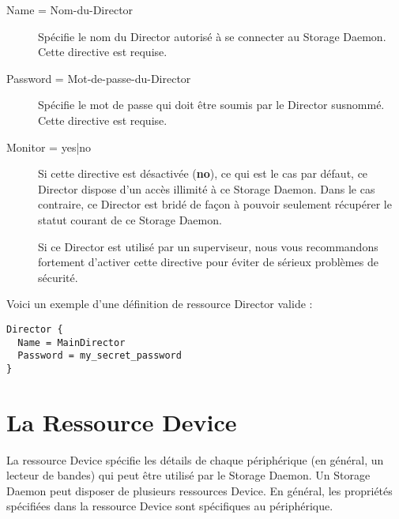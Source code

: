 \begin{description}

\item [Name = \lt{}Nom-du-Director\gt{}]
   Sp\'ecifie le nom du Director autoris\'e \`a se connecter au Storage Daemon.
   Cette directive est requise.

\item [Password = \lt{}Mot-de-passe-du-Director\gt{}]
   Sp\'ecifie le mot de passe qui doit \^etre soumis par le Director susnomm\'e.
   Cette directive est requise.

\item [Monitor = \lt{}yes|no\gt{}]
   Si cette directive est d\'esactiv\'ee ({\bf no}), ce qui est le cas par d\'efaut, 
   ce Director dispose d'un acc\`es illimit\'e \`a ce Storage Daemon. Dans le cas 
   contraire, ce Director est brid\'e de fa\c {c}on \`a pouvoir seulement r\'ecup\'erer le 
   statut courant de ce Storage Daemon.

   Si ce Director est utilis\'e par un superviseur, nous vous recommandons 
   fortement d'activer cette directive pour \'eviter de s\'erieux probl\`emes de 
   s\'ecurit\'e.

\end{description}

Voici un exemple d'une d\'efinition de ressource Director valide :

\footnotesize
\begin{verbatim}
Director {
  Name = MainDirector
  Password = my_secret_password
}
\end{verbatim}
\normalsize

\label{DeviceResource}
\section{La Ressource Device}

La ressource Device sp\'ecifie les d\'etails de chaque p\'eriph\'erique (en g\'en\'eral, 
un lecteur de bandes) qui peut \^etre utilis\'e par le Storage Daemon. Un 
Storage Daemon peut disposer de plusieurs ressources Device. En g\'en\'eral, 
les propri\'et\'es sp\'ecifi\'ees dans la ressource Device sont sp\'ecifiques 
au p\'eriph\'erique.

